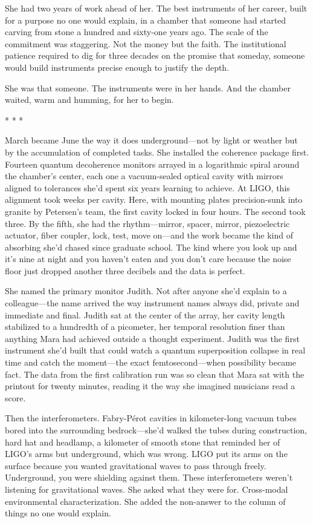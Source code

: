 \documentclass[12pt]{article}
\newcommand{\scenebreak}{\begin{center}* * *\end{center}}
\begin{document}
She had two years of work ahead of her. The best instruments of her career, built for a purpose no one would explain, in a chamber that someone had started carving from stone a hundred and sixty-one years ago. The scale of the commitment was staggering. Not the money but the faith. The institutional patience required to dig for three decades on the promise that someday, someone would build instruments precise enough to justify the depth.

She was that someone. The instruments were in her hands. And the chamber waited, warm and humming, for her to begin.

\scenebreak

March became June the way it does underground---not by light or weather but by the accumulation of completed tasks. She installed the coherence package first. Fourteen quantum decoherence monitors arrayed in a logarithmic spiral around the chamber's center, each one a vacuum-sealed optical cavity with mirrors aligned to tolerances she'd spent six years learning to achieve. At LIGO, this alignment took weeks per cavity. Here, with mounting plates precision-sunk into granite by Petersen's team, the first cavity locked in four hours. The second took three. By the fifth, she had the rhythm---mirror, spacer, mirror, piezoelectric actuator, fiber coupler, lock, test, move on---and the work became the kind of absorbing she'd chased since graduate school. The kind where you look up and it's nine at night and you haven't eaten and you don't care because the noise floor just dropped another three decibels and the data is perfect.

She named the primary monitor Judith. Not after anyone she'd explain to a colleague---the name arrived the way instrument names always did, private and immediate and final. Judith sat at the center of the array, her cavity length stabilized to a hundredth of a picometer, her temporal resolution finer than anything Mara had achieved outside a thought experiment. Judith was the first instrument she'd built that could watch a quantum superposition collapse in real time and catch the moment---the exact femtosecond---when possibility became fact. The data from the first calibration run was so clean that Mara sat with the printout for twenty minutes, reading it the way she imagined musicians read a score.

Then the interferometers. Fabry-P\'{e}rot cavities in kilometer-long vacuum tubes bored into the surrounding bedrock---she'd walked the tubes during construction, hard hat and headlamp, a kilometer of smooth stone that reminded her of LIGO's arms but underground, which was wrong. LIGO put its arms on the surface because you wanted gravitational waves to pass through freely. Underground, you were shielding against them. These interferometers weren't listening for gravitational waves. She asked what they were for. Cross-modal environmental characterization. She added the non-answer to the column of things no one would explain.
\end{document}
